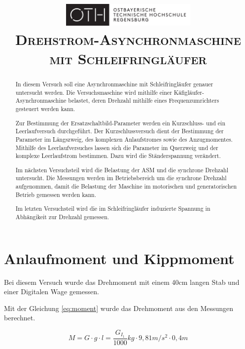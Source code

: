 \documentclass[conference]{IEEEtran}
\begin{document}
\title{
    \centering
    \includegraphics[width=0.5\textwidth]{../OTHR_OTHR_Logo.pdf}\\
    \textsc{Drehstrom-Asynchronmaschine mit Schleifringläufer} \\
}

\maketitle

\begin{abstract}
    In diesem Versuch soll eine Asynchronmaschine mit Schleifringläufer genauer
    untersucht werden. Die Versuchsmaschine wird mithilfe einer
    Käfigläufer-Asynchronmaschine belastet, deren Drehzahl mithilfe eines
    Frequenzumrichters gesteuert werden kann.

    Zur Bestimmung der Ersatzschaltbild-Parameter werden ein Kurzschluss- und
    ein Leerlaufversuch durchgeführt. Der Kurzschlussversuch dient der
    Bestimmung der Parameter im Längszweig, des komplexen Anlaufstromes sowie
    des Anzugmomentes. Mithilfe des Leerlaufversuches lassen sich die Parameter
    im Querzweig und der komplexe Leerlaufstrom bestimmen. Dazu wird die
    Ständerspannung verändert.

    Im nächsten Versuchsteil wird die Belastung der ASM und die synchrone
    Drehzahl untersucht. Die Messungen werden im Betriebsbereich um die
    synchrone Drehzahl aufgenommen, damit die Belastung der Maschine im
    motorischen und generatorischen Betrieb gemessen werden kann.

    Im letzten Versuchsteil wird die im Schleifringläufer induzierte Spannung
    in Abhängikeit zur Drehzahl gemessen.

\end{abstract}

\section{Anlaufmoment und Kippmoment}

Bei diesem Versuch wurde das Drehmoment mit einem 40cm langen Stab und einer
Digitalen Wage gemessen.

Mit der Gleichung \ref{eq:moment} wurde das Drehmoment aus den Messungen berechnet.

\begin{equation} \label{eq:moment}
    M=G\cdot g\cdot l = \frac{G_{I_1}}{1000}\si{kg}\cdot 9,81\si{m/s^2} \cdot 0,4\si{m}
\end{equation}
\end{document}
